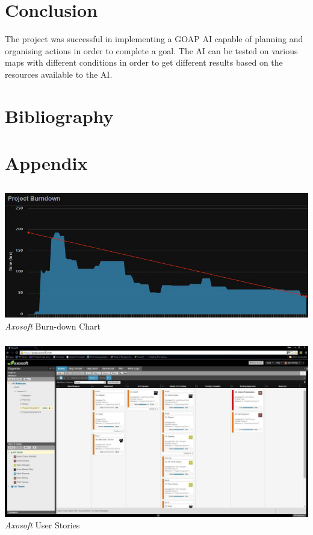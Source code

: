 \documentclass[a4paper]{report}
\begin{document}
\chapter{Conclusion}
The project was successful in implementing a GOAP AI capable of planning and organising actions in order to complete a goal. The AI can be tested on various maps with different conditions in order to get different results based on the resources available to the AI. 


\chapter{Bibliography}
\appendix
\chapter{Appendix}
\section{}
\subsection{}
	\includegraphics[width=1.0\linewidth]{./appendixImages/AxosoftScreenShot01}
	\textit{Axosoft} Burn-down Chart 
\subsection{}
	\includegraphics[width=1.0\linewidth]{./appendixImages/AxosoftScreenShot02}
	\textit{Axosoft} User Stories
\pagebreak
\end{document}
